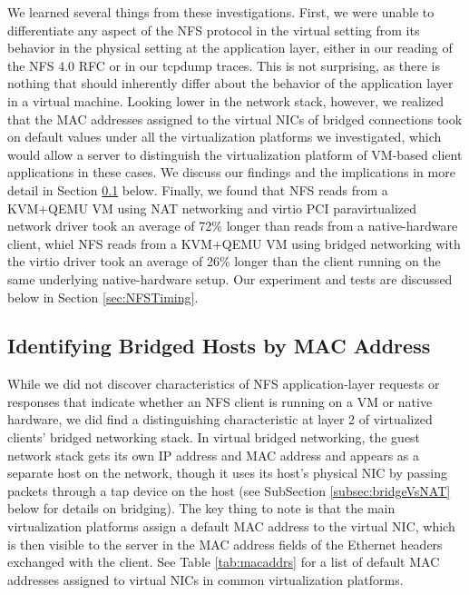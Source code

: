 \documentclass[11pt,pdftex,twocolumn]{article}
\begin{document}
We learned several things from these investigations. First, we were unable to differentiate any aspect of the NFS protocol in the virtual setting from its behavior in the physical setting at the application layer, either in our reading of the NFS 4.0 RFC or in our tcpdump traces. This is not surprising, as there is nothing that should inherently differ about the behavior of the application layer in a virtual machine. Looking lower in the network stack, however, we realized that the MAC addresses assigned to the virtual NICs of bridged connections took on default values under all the virtualization platforms we investigated, which would allow a server to distinguish the virtualization platform of VM-based client applications in these cases. We discuss our findings and the implications in more detail in Section \ref{sec:macaddrs} below. Finally, we found that NFS reads from a KVM+QEMU VM using NAT networking and virtio PCI paravirtualized network driver took an average of 72\% longer than reads from a native-hardware client, whiel NFS reads from a KVM+QEMU VM using bridged networking with the virtio driver took an average of 26\% longer than the client running on the same underlying native-hardware setup. Our experiment and tests are discussed below in Section \ref{sec:NFSTiming}. 

\subsection{Identifying Bridged Hosts by MAC Address}
\label{sec:macaddrs}
While we did not discover characteristics of NFS application-layer requests or responses that indicate whether an NFS client is running on a VM or native hardware, we did find a distinguishing characteristic at layer 2 of virtualized clients' bridged networking stack. In virtual bridged networking, the guest network stack gets its own IP address and MAC address and appears as a separate host on the network, though it uses its host's physical NIC by passing packets through a tap device on the host (see SubSection \ref{subsec:bridgeVsNAT} below for details on bridging). The key thing to note is that the main virtualization platforms assign a default MAC address to the virtual NIC, which is then visible to the server in the MAC address fields of the Ethernet headers exchanged with the client. See Table \ref{tab:macaddrs} for a list of default MAC addresses assigned to virtual NICs in common virtualization platforms. 
\end{document}

